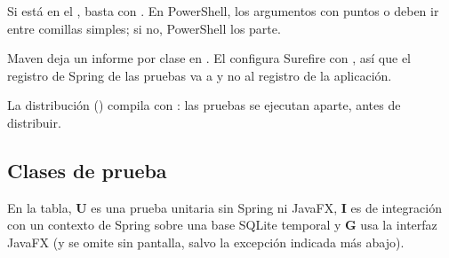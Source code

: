 Si  está en el , basta con . En PowerShell, los argumentos  con
puntos o \ruta{\#} deben ir entre comillas simples; si no, PowerShell los parte.

\begin{nota}
Maven deja un informe por clase en . El  configura Surefire con
, así que el registro de Spring de las pruebas va a
 y no al registro de la aplicación.
\end{nota}

La distribución () compila con : las pruebas se
ejecutan aparte, antes de distribuir.

\subsection{Clases de prueba}

En la tabla, \textbf{U} es una prueba unitaria sin Spring ni JavaFX, \textbf{I} es de integración con un contexto de
Spring sobre una base SQLite temporal y \textbf{G} usa la interfaz JavaFX (y se omite sin pantalla, salvo la excepción
indicada más abajo).

